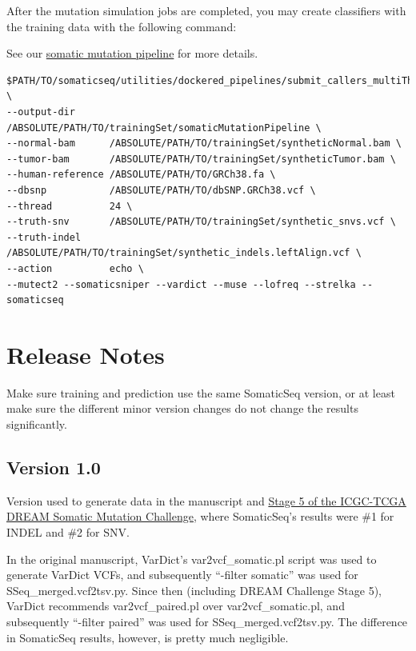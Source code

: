 \documentclass[10pt,letterpaper]{article}
\begin{document}
\begin{sloppypar}
After the mutation simulation jobs are completed, you may create classifiers with the training data with the following command:

See our \href{https://github.com/bioinform/somaticseq/blob/master/utilities/dockered_pipelines}{somatic mutation pipeline} for more details.

\begin{lstlisting}
$PATH/TO/somaticseq/utilities/dockered_pipelines/submit_callers_multiThreads.sh \
--output-dir      /ABSOLUTE/PATH/TO/trainingSet/somaticMutationPipeline \
--normal-bam      /ABSOLUTE/PATH/TO/trainingSet/syntheticNormal.bam \
--tumor-bam       /ABSOLUTE/PATH/TO/trainingSet/syntheticTumor.bam \
--human-reference /ABSOLUTE/PATH/TO/GRCh38.fa \
--dbsnp           /ABSOLUTE/PATH/TO/dbSNP.GRCh38.vcf \
--thread          24 \
--truth-snv       /ABSOLUTE/PATH/TO/trainingSet/synthetic_snvs.vcf \
--truth-indel     /ABSOLUTE/PATH/TO/trainingSet/synthetic_indels.leftAlign.vcf \
--action          echo \
--mutect2 --somaticsniper --vardict --muse --lofreq --strelka --somaticseq
\end{lstlisting}





\section{Release Notes}

Make sure training and prediction use the same SomaticSeq version, or at least make sure the different minor version changes do not change the results significantly. 


\subsection{Version 1.0}
Version used to generate data in the manuscript and \href{https://www.synapse.org/#!Synapse:syn312572/wiki/72943}{Stage 5 of the ICGC-TCGA DREAM Somatic Mutation Challenge}, where SomaticSeq's results were \#1 for INDEL and \#2 for SNV. 

In the original manuscript, VarDict's var2vcf\_somatic.pl script was used to generate VarDict VCFs, and subsequently ``-filter somatic'' was used for SSeq\_merged.vcf2tsv.py. Since then (including DREAM Challenge Stage 5), VarDict recommends var2vcf\_paired.pl over var2vcf\_somatic.pl, and subsequently ``-filter paired'' was used for SSeq\_merged.vcf2tsv.py. The difference in SomaticSeq results, however, is pretty much negligible. 


\end{sloppypar}
\end{document}
